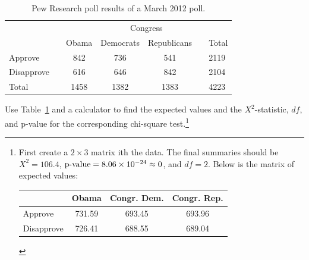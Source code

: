 \textA{\newpage}

\begin{table}
\begin{tabular}{ll ccc ll}
& & & \multicolumn{2}{c}{Congress} & \\
\cline{4-5}
 & \hspace{1mm} & Obama & Democrats & Republicans & \hspace{1mm} & Total \\
\hline
Approve				   & & 842    & 736 & 541   & 				& 2119 \\
Disapprove			   & & 616    & 646 & 842   &				& 2104 \\
\hline
Total					   & & 1458    & 1382 & 1383 & 				& 4223 \\
\hline
\end{tabular}
\caption{Pew Research poll results of a March 2012 poll.}
\label{pewResearchPollOnApprovalRatingsForChiSquareSectionExampleAndExercisesAgain}
\end{table}
 

\begin{exercise}
Use Table~\ref{pewResearchPollOnApprovalRatingsForChiSquareSectionExampleAndExercisesAgain} and a calculator to find the expected values and the $X^2$-statistic, $df$, and p-value for the corresponding chi-square test.\footnote{First create a $2\times 3$ matrix ith the data. The final summaries should be $X^2=106.4$, $\text{\mbox{p-value}} = 8.06 \times 10^{-24}\approx 0$, and $df=2$. Below is the matrix of expected values:
\begin{center}
\begin{tabular}{l ccc}
&Obama  &Congr. Dem. & Congr. Rep. \\
\hline
Approve				    & 731.59    & 693.45 & 693.96   \\
Disapprove			    & 726.41    & 688.55 & 689.04  \\
\hline
\end{tabular}
\end{center}
}
\end{exercise}
